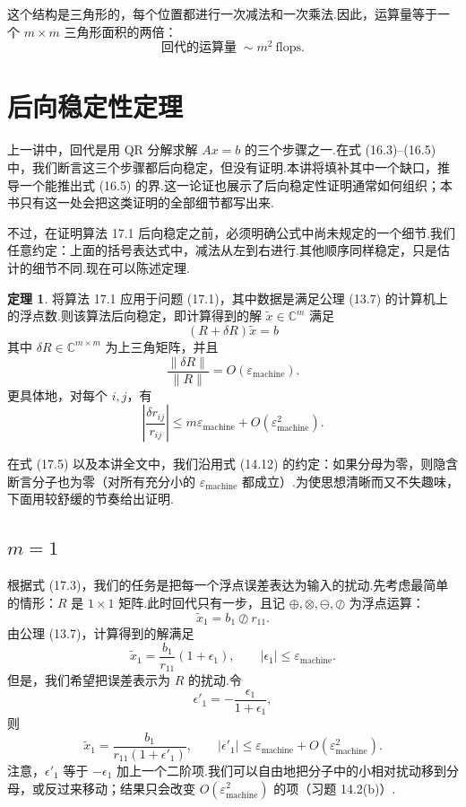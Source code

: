 \documentclass[UTF8,fontset=none,12pt]{ctexart}
\newcommand{\C}{\mathbb{C}}
\newcommand{\epsmach}{\varepsilon_{\mathrm{machine}}}
\theoremstyle{definition}
\newtheorem{theorem}{定理}
\begin{document}
这个结构是三角形的，每个位置都进行一次减法和一次乘法.因此，运算量等于一个 $m\times m$ 三角形面积的两倍：
\begin{equation}
\text{回代的运算量}\;\sim m^2\ \text{flops}.
\tag{17.2}
\end{equation}

\section*{后向稳定性定理}

上一讲中，回代是用 QR 分解求解 $Ax=b$ 的三个步骤之一.在式 (16.3)--(16.5) 中，我们断言这三个步骤都后向稳定，但没有证明.本讲将填补其中一个缺口，推导一个能推出式 (16.5) 的界.这一论证也展示了后向稳定性证明通常如何组织；本书只有这一处会把这类证明的全部细节都写出来.

不过，在证明算法 17.1 后向稳定之前，必须明确公式中尚未规定的一个细节.我们任意约定：上面的括号表达式中，减法从左到右进行.其他顺序同样稳定，只是估计的细节不同.现在可以陈述定理.

\begin{theorem}
将算法 17.1 应用于问题 (17.1)，其中数据是满足公理 (13.7) 的计算机上的浮点数.则该算法后向稳定，即计算得到的解 $\widetilde x\in\C^m$ 满足
\begin{equation}
    (R+\delta R)\widetilde x=b
    \tag{17.3}
\end{equation}
其中 $\delta R\in\C^{m\times m}$ 为上三角矩阵，并且
\begin{equation}
    \frac{\|\delta R\|}{\|R\|}=O(\epsmach).
    \tag{17.4}
\end{equation}
更具体地，对每个 $i,j$，有
\begin{equation}
    \left|\frac{\delta r_{ij}}{r_{ij}}\right|
    \le m\epsmach+O(\epsmach^2).
    \tag{17.5}
\end{equation}
\end{theorem}

在式 (17.5) 以及本讲全文中，我们沿用式 (14.12) 的约定：如果分母为零，则隐含断言分子也为零（对所有充分小的 $\epsmach$ 都成立）.为使思想清晰而又不失趣味，下面用较舒缓的节奏给出证明.

\subsection*{$m=1$}

根据式 (17.3)，我们的任务是把每一个浮点误差表达为输入的扰动.先考虑最简单的情形：$R$ 是 $1\times1$ 矩阵.此时回代只有一步，且记 $\oplus,\otimes,\ominus,\oslash$ 为浮点运算：
\[
\widetilde x_1=b_1\oslash r_{11}.
\]
由公理 (13.7)，计算得到的解满足
\[
\widetilde x_1=\frac{b_1}{r_{11}}(1+\epsilon_1),
\qquad |\epsilon_1|\le\epsmach.
\]
但是，我们希望把误差表示为 $R$ 的扰动.令
\[
\epsilon'_1=-\frac{\epsilon_1}{1+\epsilon_1},
\]
则
\begin{equation}
    \widetilde x_1=\frac{b_1}{r_{11}(1+\epsilon'_1)},
    \qquad |\epsilon'_1|\le\epsmach+O(\epsmach^2).
    \tag{17.6}
\end{equation}
注意，$\epsilon'_1$ 等于 $-\epsilon_1$ 加上一个二阶项.我们可以自由地把分子中的小相对扰动移到分母，或反过来移动；结果只会改变 $O(\epsmach^2)$ 的项（习题 14.2(b)）.
\end{document}
